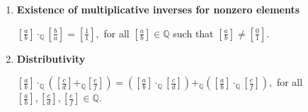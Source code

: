 \documentclass[11pt]{article}
\begin{document}
\begin{theorem}[2.9]
\begin{enumerate}
    $\displaystyle \left[\frac{a}{b}\right] \cdot_{\mathbb{Q}}\left[\frac{1}{1}\right]=\left[\frac{a}{b}\right],$ for all $\displaystyle \left[\frac{a}{b}\right] \in\mathbb{Q}.$

\item[h)] {\bf Existence of multiplicative inverses for nonzero elements}

$\displaystyle \left[\frac{a}{b}\right] \cdot_{\mathbb{Q}}\left[\frac{b}{a}\right]=\left[\frac{1}{1}\right],$ for all $\displaystyle \left[\frac{a}{b}\right] \in\mathbb{Q}$ such that $\displaystyle\left[\frac{a}{b}\right]\neq \left[\frac{0}{1}\right].$ 
\item[i)] {\bf Distributivity} 

$\displaystyle \left[\frac{a}{b}\right]\cdot_{\mathbb{Q}} \left(\left[\frac{c}{d}\right]+_{\mathbb{Q}}\left[\frac{e}{f}\right]\right)=\left(\left[\frac{a}{b}\right]\cdot_{\mathbb{Q}} \left[\frac{c}{d}\right]\right) +_{\mathbb{Q}} \left( \left[\frac{a}{b}\right]\cdot_{\mathbb{Q}} \left[\frac{e}{f}\right]\right),$ for all $\displaystyle \left[\frac{a}{b}\right],\left[\frac{c}{d}\right], \left[\frac{e}{f}\right] \in\mathbb{Q}.$  
\end{enumerate}    
\end{theorem}
\end{document}
